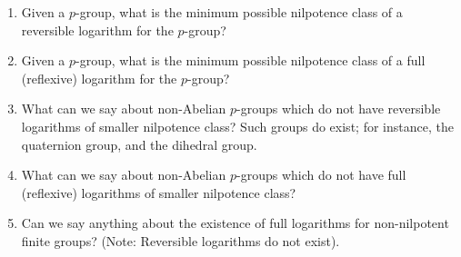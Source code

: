 \documentclass[a4paper]{amsart}
\begin{document}
\begin{enumerate}

\item Given a $p$-group, what is the minimum possible nilpotence class
  of a reversible logarithm for the $p$-group?

\item Given a $p$-group, what is the minimum possible nilpotence class
  of a full (reflexive) logarithm for the $p$-group?

\item What can we say about non-Abelian $p$-groups which do not have reversible
  logarithms of smaller nilpotence class? Such groups do exist; for
  instance, the quaternion group, and the dihedral group.

\item What can we say about non-Abelian $p$-groups which do not have
  full (reflexive) logarithms of smaller nilpotence class?

\item Can we say anything about the existence of full logarithms for
  non-nilpotent finite groups? (Note: Reversible logarithms do not
  exist).

\end{enumerate}



\printindex
\end{document}

